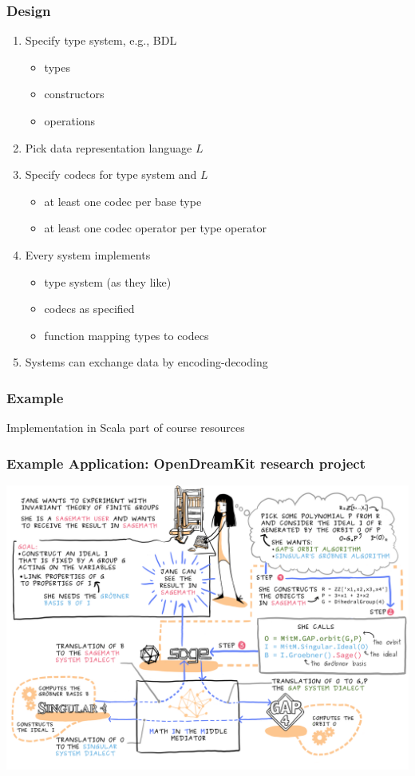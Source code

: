 \documentclass{beamer}
\begin{document}
\begin{frame}\frametitle{Design}
\begin{enumerate}
\item Specify type system, e.g., BDL
 \begin{itemize}
 \item types
 \item constructors
 \item operations
 \end{itemize}
\item Pick data representation language $L$
\item Specify codecs for type system and $L$
 \begin{itemize}
 \item at least one codec per base type
 \item at least one codec operator per type operator
 \end{itemize}
\item Every system implements
 \begin{itemize}
 \item type system (as they like)
 \item codecs as specified
 \item function mapping types to codecs
 \end{itemize}
\item Systems can exchange data by encoding-decoding
\end{enumerate}
\end{frame}

\begin{frame}\frametitle{Example}
Implementation in Scala part of course resources
\end{frame}

\begin{frame}\frametitle{Example Application: OpenDreamKit research project}
\includegraphics[width=\textwidth]{MitM.png}
\end{frame}
\end{document}
